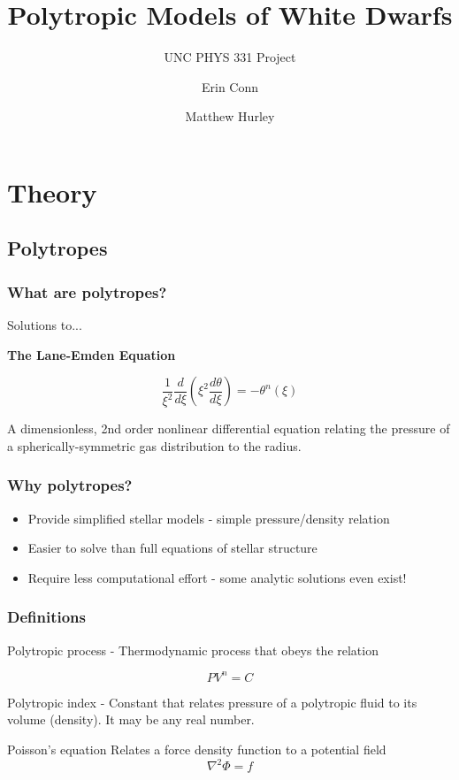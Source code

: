 \documentclass{beamer}
\title[Polytropes] %
{Polytropic Models of White Dwarfs}
\subtitle{UNC PHYS 331 Project}
\author[Conn, Hurley] %
{Erin Conn \and Matthew Hurley}
\begin{document}
    \frame{\titlepage}

    \section{Theory}

        \subsection{Polytropes}

        \begin{frame}
            \frametitle{What are polytropes?}

            Solutions to...

            \textbf{The Lane-Emden Equation}

            \[
                \frac{1}{\xi^2}\frac{d}{d\xi}\left(\xi^2\frac{d\theta}{d\xi}\right)=-\theta^n(\xi)
            \]

            A dimensionless, 2nd order nonlinear differential equation relating the
            pressure of a spherically-symmetric gas distribution to the radius.

        \end{frame}

        \begin{frame}
            \frametitle{Why polytropes?}

            \begin{itemize}
                \item Provide simplified stellar models - simple pressure/density relation
                    \pause
                \item Easier to solve than full equations of stellar structure
                    \pause
                \item Require less computational effort - some analytic solutions even exist!
            \end{itemize}

        \end{frame}

        \begin{frame}
            \frametitle{Definitions}

            \begin{definition}
                \alert{Polytropic process} - Thermodynamic process that obeys the relation
                
                \[PV^n=C\]
            \end{definition} 
                    \pause
            \begin{definition}
                \alert{Polytropic index} - Constant that relates pressure of a polytropic fluid to its volume (density). It may be any real number.
            \end{definition}
            \pause
            \begin{definition}
                \alert{Poisson's equation} Relates a force density function to a potential field
                    \[\nabla^2\Phi=f\]
            \end{definition}

        \end{frame}
\end{document}
